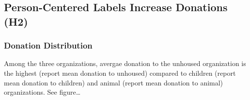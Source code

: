 \documentclass[
  man,
  floatsintext,
  longtable,
  nolmodern,
  notxfonts,
  notimes,
  colorlinks=true,linkcolor=blue,citecolor=blue,urlcolor=blue]{apa7}
\begin{document}
\begin{figure}

\caption{\label{fig-correlation-stigma-stereotype}}


\end{figure}%

\subsection{Person-Centered Labels Increase Donations
(H2)}\label{person-centered-labels-increase-donations-h2}

\subsubsection{Donation Distribution}\label{donation-distribution}

Among the three organizations, avergae donation to the unhoused
organization is the highest (report mean donation to unhoused) compared
to children (report mean donation to children) and animal (report mean
donation to animal) organizations. See figure\ldots{}
\end{document}
